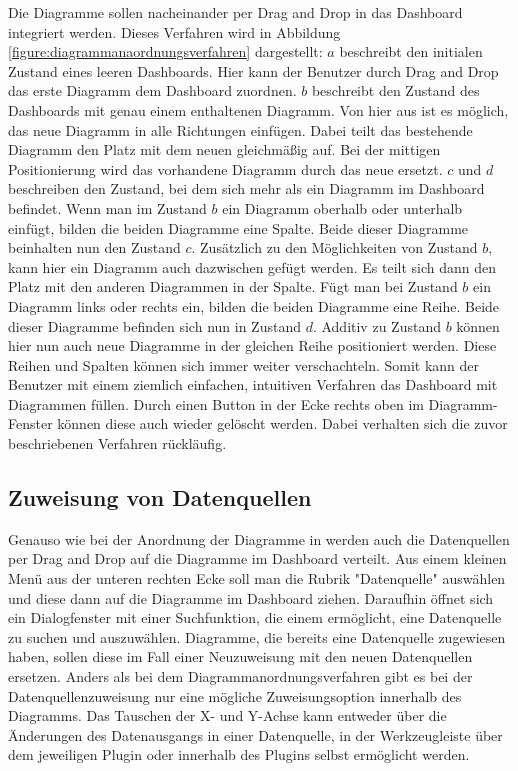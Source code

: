 Die Diagramme sollen nacheinander per Drag and Drop in das Dashboard integriert werden. Dieses Verfahren
wird in Abbildung \ref{figure:diagrammanaordnungsverfahren} dargestellt: \(a\) beschreibt den
initialen Zustand eines leeren Dashboards. Hier kann der Benutzer durch Drag and Drop das erste Diagramm dem Dashboard
zuordnen. \(b\) beschreibt den Zustand des Dashboards mit genau einem enthaltenen Diagramm. Von hier aus ist es möglich, das
neue Diagramm in alle Richtungen einfügen. Dabei teilt das bestehende Diagramm den Platz mit dem neuen gleichmäßig
auf. Bei der mittigen Positionierung wird das vorhandene Diagramm durch das neue ersetzt. \(c\) und \(d\)
beschreiben den Zustand, bei dem sich mehr als ein Diagramm im Dashboard befindet. Wenn man im Zustand \(b\)
ein Diagramm oberhalb oder unterhalb einfügt, bilden die beiden Diagramme eine Spalte. Beide dieser Diagramme
beinhalten nun den Zustand \(c\). Zusätzlich zu den Möglichkeiten von Zustand \(b\), kann hier ein Diagramm
auch dazwischen gefügt werden. Es teilt sich dann den Platz mit den anderen Diagrammen in der Spalte.
Fügt man bei Zustand \(b\) ein Diagramm links oder rechts ein, bilden die beiden Diagramme eine Reihe.
Beide dieser Diagramme befinden sich nun in Zustand \(d\). Additiv zu Zustand \(b\) können hier nun
auch neue Diagramme in der gleichen Reihe positioniert werden. Diese Reihen und Spalten können sich
immer weiter verschachteln. Somit kann der Benutzer mit einem ziemlich einfachen, intuitiven Verfahren
das Dashboard mit Diagrammen füllen. Durch einen Button in der Ecke rechts oben im Diagramm-Fenster
können diese auch wieder gelöscht werden. Dabei verhalten sich die zuvor beschriebenen Verfahren rückläufig.

\subsection{Zuweisung von Datenquellen}
\label{subsec:zuweisungungvondatenquellen}
Genauso wie bei der Anordnung der Diagramme in  werden
auch die Datenquellen per Drag and Drop auf die Diagramme im Dashboard verteilt. Aus einem kleinen
Menü aus der unteren rechten Ecke soll man die Rubrik "Datenquelle" auswählen und diese dann auf
die Diagramme im Dashboard ziehen. Daraufhin öffnet sich ein Dialogfenster mit einer Suchfunktion,
die einem ermöglicht, eine Datenquelle zu suchen und auszuwählen. Diagramme, die bereits eine
Datenquelle zugewiesen haben, sollen diese im Fall einer Neuzuweisung mit den neuen Datenquellen
ersetzen. Anders als bei dem Diagrammanordnungsverfahren gibt es bei der Datenquellenzuweisung
nur eine mögliche Zuweisungsoption innerhalb des Diagramms. Das Tauschen der X- und Y-Achse kann
entweder über die Änderungen des Datenausgangs in einer Datenquelle, in der Werkzeugleiste über
dem jeweiligen Plugin oder innerhalb des Plugins selbst ermöglicht werden.

